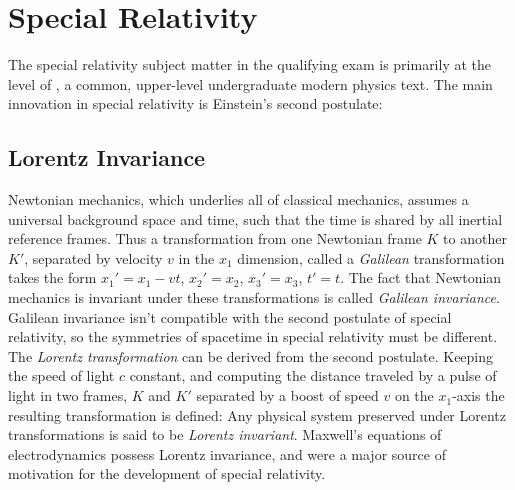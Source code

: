\newpage
\chapter{Special Relativity}
\label{sec:specrel}
The special relativity subject matter in the qualifying exam is primarily at the level of \cite{ohanianModernPhysics1995}, a common, upper-level undergraduate modern physics text. The main innovation in special relativity is Einstein's second postulate:

\section{Lorentz Invariance}
Newtonian mechanics, which underlies all of classical mechanics, assumes a universal background space and time, such that the time is shared by all inertial reference frames. Thus a transformation from one Newtonian frame $K$ to another $K'$, separated by velocity $v$ in the $x_1$ dimension, called a \textit{Galilean} transformation takes the form $x_1'=x_1-vt$, $x_2'=x_2$, $x_3'=x_3$, $t'=t$. The fact that Newtonian mechanics is invariant under these transformations is called \textit{Galilean invariance}.\\
\indent Galilean invariance isn't compatible with the second postulate of special relativity, so the symmetries of spacetime in special relativity must be different. The \textit{Lorentz transformation} can be derived from the second postulate. Keeping the speed of light $c$ constant, and computing the distance traveled by a pulse of light in two frames, $K$ and $K'$ separated by a boost of speed $v$ on the $x_1$-axis the resulting transformation is defined:
Any physical system preserved under Lorentz transformations is said to be \textit{Lorentz invariant}. Maxwell's equations of electrodynamics possess Lorentz invariance, and were a major source of motivation for the development of special relativity.


